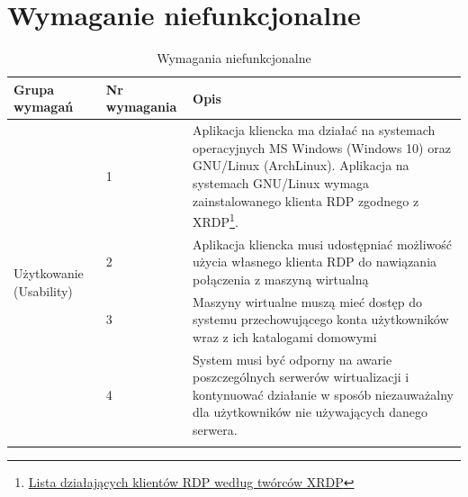 \documentclass[../praca-dyplomowa.tex]{subfiles}
\begin{document}
\section{Wymaganie niefunkcjonalne}

\begin{table}[H]
    \caption[Opis skrócony]{Wymagania niefunkcjonalne}
    \label{non-functional}
    \centering
    \begin{tabular}{|p{}|p{}|p{}|}
        \hline Grupa wymagań                            & Nr wymagania & Opis                                                                                                                                                                                                                                                                                                                  \\ \hline
        \multirow[t]{8}{=}{Użytkowanie (Usability)}     & 1            & Aplikacja kliencka ma działać na systemach operacyjnych MS Windows (Windows 10) oraz GNU/Linux (ArchLinux). Aplikacja na systemach GNU/Linux wymaga zainstalowanego klienta RDP zgodnego z XRDP\footnote{\href{https://github.com/neutrinolabs/xrdp\#overview}{Lista działających klientów RDP według twórców XRDP}}. \\ \cline{2-3}
                                                        & 2            & Aplikacja kliencka musi udostępniać możliwość użycia własnego klienta RDP do nawiązania połączenia z maszyną wirtualną                                                                                                                                                                                                \\ \cline{2-3}
                                                        & 3            & Maszyny wirtualne muszą mieć dostęp do systemu przechowującego konta użytkowników wraz z ich katalogami domowymi                                                                                                                                                                                                      \\ \hline
        \multirow[t]{7}{=}{Niezawodność (Reliability)}  & 4            & System musi być odporny na awarie poszczególnych serwerów wirtualizacji i kontynuować działanie w sposób niezauważalny dla użytkowników nie używających danego serwera.                                                                                                                                               \\ \cline{2-3}

\end{tabular}
\end{table}
\end{document}
